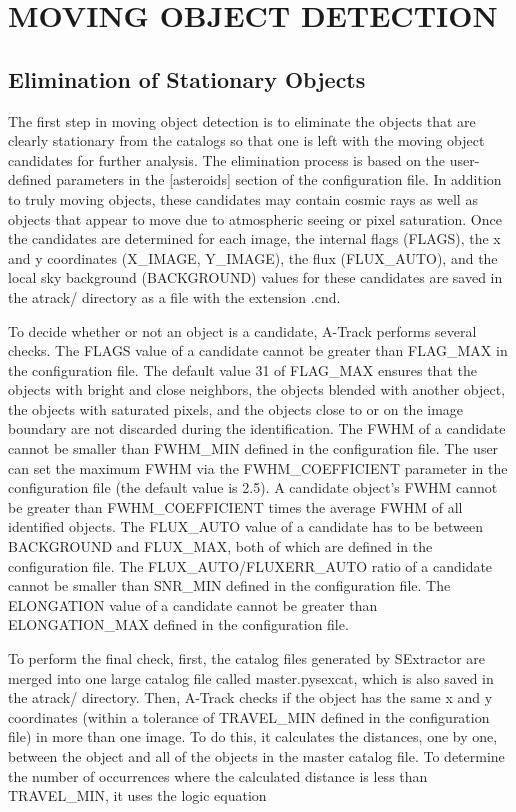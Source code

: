 \documentclass[review]{elsarticle}
\begin{document}
\section{MOVING OBJECT DETECTION}

\subsection{Elimination of Stationary Objects}

The first step in moving object detection is to eliminate the objects that are clearly stationary from the catalogs so that one is left with the moving object candidates for further analysis. The elimination process is based on the user-defined parameters in the [asteroids] section of the configuration file. In addition to truly moving objects, these candidates may contain cosmic rays as well as objects that appear to move due to atmospheric seeing or pixel saturation. Once the candidates are determined for each image, the internal flags (FLAGS), the x and y coordinates (X\_IMAGE, Y\_IMAGE), the flux (FLUX\_AUTO), and the local sky background (BACKGROUND) values for these candidates are saved in the atrack/ directory as a file with the extension .cnd.

To decide whether or not an object is a candidate, A-Track performs several checks. The FLAGS value of a candidate cannot be greater than FLAG\_MAX in the configuration file. The default value 31 of FLAG\_MAX ensures that the objects with bright and close neighbors, the objects blended with another object, the objects with saturated pixels, and the objects close to or on the image boundary are not discarded during the identification. The FWHM of a candidate cannot be smaller than FWHM\_MIN defined in the configuration file. The user can set the maximum FWHM via the FWHM\_COEFFICIENT parameter in the configuration file (the default value is 2.5). A candidate object's FWHM cannot be greater than FWHM\_COEFFICIENT times the average FWHM of all identified objects. The FLUX\_AUTO value of a candidate has to be between BACKGROUND and FLUX\_MAX, both of which are defined in the configuration file. The FLUX\_AUTO/FLUXERR\_AUTO ratio of a candidate cannot be smaller than SNR\_MIN defined in the configuration file. The ELONGATION value of a candidate cannot be greater than ELONGATION\_MAX defined in the configuration file.

To perform the final check, first, the catalog files generated by SExtractor are merged into one large catalog file called master.pysexcat, which is also saved in the atrack/ directory. Then, A-Track checks if the object has the same x and y coordinates (within a tolerance of TRAVEL\_MIN defined in the configuration file) in more than one image. To do this, it calculates the distances, one by one, between the object and all of the objects in the master catalog file. To determine the number of occurrences where the calculated distance is less than TRAVEL\_MIN, it uses the logic equation
\end{document}
